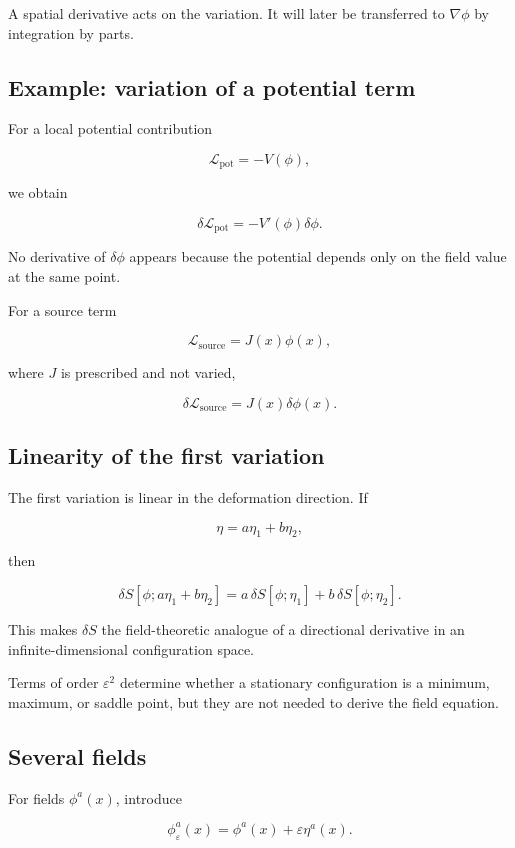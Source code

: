 A spatial derivative acts on the variation. It will later be transferred to \(\nabla\phi\) by integration by parts.

\subsection{Example: variation of a potential term}

For a local potential contribution

\[
\mathcal{L}_{\mathrm{pot}}
=
-V(\phi),
\]

we obtain

\[
\boxed{
\delta\mathcal{L}_{\mathrm{pot}}
=
-V'(\phi)\delta\phi
}.
\]

No derivative of \(\delta\phi\) appears because the potential depends only on the field value at the same point.

For a source term

\[
\mathcal{L}_{\mathrm{source}}=J(x)\phi(x),
\]

where \(J\) is prescribed and not varied,

\[
\boxed{
\delta\mathcal{L}_{\mathrm{source}}
=
J(x)\delta\phi(x)
}.
\]

\subsection{Linearity of the first variation}

The first variation is linear in the deformation direction. If

\[
\eta=a\eta_{1}+b\eta_{2},
\]

then

\[
\delta S[\phi;a\eta_{1}+b\eta_{2}]
=
a\,\delta S[\phi;\eta_{1}]
+
b\,\delta S[\phi;\eta_{2}].
\]

This makes \(\delta S\) the field-theoretic analogue of a directional derivative in an infinite-dimensional configuration space.

Terms of order \(\varepsilon^{2}\) determine whether a stationary configuration is a minimum, maximum, or saddle point, but they are not needed to derive the field equation.

\subsection{Several fields}

For fields \(\phi^{a}(x)\), introduce

\[
\phi^{a}_{\varepsilon}(x)
=
\phi^{a}(x)+\varepsilon\eta^{a}(x).
\]

